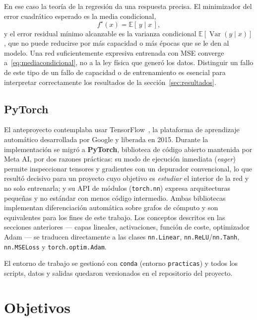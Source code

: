 \documentclass[titlepage,11pt]{article}
\begin{document}
En ese caso la teoría de la regresión da una respuesta precisa. El minimizador
del error cuadrático esperado es la media condicional,
\begin{equation}
  f^{\star}(x)=\mathbb{E}[\,y\mid x\,],
  \label{eq:mediacondicional}
\end{equation}
y el error residual mínimo alcanzable es la varianza condicional
$\mathbb{E}[\operatorname{Var}(y\mid x)]$, que no puede reducirse por más
capacidad o más épocas que se le den al modelo. Una red suficientemente
expresiva entrenada con MSE converge a~\eqref{eq:mediacondicional}, no a la ley
física que generó los datos. Distinguir un fallo de este tipo de un fallo de
capacidad o de entrenamiento es esencial para interpretar correctamente los
resultados de la sección~\ref{sec:resultados}.

\subsection{PyTorch}
\label{subsec:ts}
El anteproyecto contemplaba usar TensorFlow~\cite{TensorFlow}, la plataforma de
aprendizaje automático desarrollada por Google y liberada en 2015. Durante la
implementación se migró a \textbf{PyTorch}, biblioteca de código abierto
mantenida por Meta AI, por dos razones prácticas: su modo de ejecución
inmediata (\emph{eager}) permite inspeccionar tensores y gradientes con un
depurador convencional, lo que resultó decisivo para un proyecto cuyo objetivo
es \emph{estudiar} el interior de la red y no solo entrenarla; y su API de
módulos (\texttt{torch.nn}) expresa arquitecturas pequeñas y no estándar con
menos código intermedio. Ambas bibliotecas implementan diferenciación
automática sobre grafos de cómputo y son equivalentes para los fines de este
trabajo. Los conceptos descritos en las secciones anteriores --- capas
lineales, activaciones, función de coste, optimizador Adam --- se traducen
directamente a las clases \texttt{nn.Linear}, \texttt{nn.ReLU}/\texttt{nn.Tanh},
\texttt{nn.MSELoss} y \texttt{torch.optim.Adam}.

El entorno de trabajo se gestionó con \texttt{conda} (entorno
\texttt{practicas}) y todos los scripts, datos y salidas quedaron versionados
en el repositorio del proyecto.


\section{Objetivos}
\label{sec:objetivos}
\end{document}
